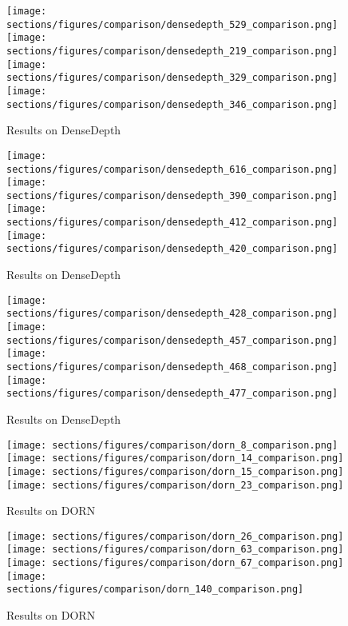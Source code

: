 \begin{figure*}
  \texttt{[image: sections/figures/comparison/densedepth\_529\_comparison.png]}
  \texttt{[image: sections/figures/comparison/densedepth\_219\_comparison.png]}
  \texttt{[image: sections/figures/comparison/densedepth\_329\_comparison.png]}
  \texttt{[image: sections/figures/comparison/densedepth\_346\_comparison.png]}
  \caption{Results on DenseDepth}
\end{figure*}
\begin{figure*}
  \texttt{[image: sections/figures/comparison/densedepth\_616\_comparison.png]}
  \texttt{[image: sections/figures/comparison/densedepth\_390\_comparison.png]}
  \texttt{[image: sections/figures/comparison/densedepth\_412\_comparison.png]}
  \texttt{[image: sections/figures/comparison/densedepth\_420\_comparison.png]}
  \caption{Results on DenseDepth}
\end{figure*}
\begin{figure*}
  \texttt{[image: sections/figures/comparison/densedepth\_428\_comparison.png]}
  \texttt{[image: sections/figures/comparison/densedepth\_457\_comparison.png]}
  \texttt{[image: sections/figures/comparison/densedepth\_468\_comparison.png]}
  \texttt{[image: sections/figures/comparison/densedepth\_477\_comparison.png]}
  \caption{Results on DenseDepth}
\end{figure*}
\begin{figure*}
  \texttt{[image: sections/figures/comparison/dorn\_8\_comparison.png]}
  \texttt{[image: sections/figures/comparison/dorn\_14\_comparison.png]}
  \texttt{[image: sections/figures/comparison/dorn\_15\_comparison.png]}
  \texttt{[image: sections/figures/comparison/dorn\_23\_comparison.png]}
  \caption{Results on DORN}
\end{figure*}
\begin{figure*}
  \texttt{[image: sections/figures/comparison/dorn\_26\_comparison.png]}
  \texttt{[image: sections/figures/comparison/dorn\_63\_comparison.png]}
  \texttt{[image: sections/figures/comparison/dorn\_67\_comparison.png]}
  \texttt{[image: sections/figures/comparison/dorn\_140\_comparison.png]}
  \caption{Results on DORN}
\end{figure*}
